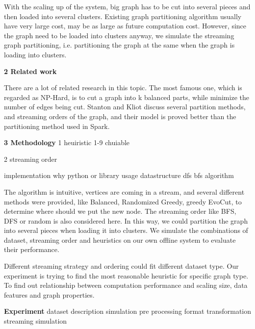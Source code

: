 \documentclass[12pt]{article}
\begin{document}
With the scaling up of the system, big graph has to be cut into several pieces and then loaded into several clusters. Existing graph partitioning algorithm usually have very large cost, may be as large as future computation cost. However, since the graph need to be loaded into clusters anyway, we simulate the streaming graph partitioning, i.e. partitioning the graph at the same when the graph is loading into clusters.

\textbf{2 Related work}

There are a lot of related research in this topic. The most famous one, which is regarded as NP-Hard, is to cut a graph into k balanced parts, while minimize the number of edges being cut. Stanton and Kliot discuss several partition methods, and streaming orders of the graph, and their model is proved better than the partitioning method used in Spark.

\textbf{3 Methodology}
1 heuiristic
	1-9 chuiable

2 streaming order

implementation
	why python or library usage
	datastructure
	dfs bfs algorithm

The algorithm is intuitive, vertices are coming in a stream, and several different methods were provided, like Balanced, Randomized Greedy, greedy EvoCut, to determine where should we put the new node. The streaming order like BFS, DFS or random is also considered here. In this way, we could partition the graph into several pieces when loading it into clusters. We simulate the combinations of dataset, streaming order and heuristics on our own offline system to evaluate their performance.

Different streaming strategy and ordering could fit different dataset type. Our experiment is trying to find the most reasonable heuristic for specific graph type. To find out relationship between computation performance and scaling size, data features and graph properties.

\textbf{Experiment}
dataset description
simulation
	pre processing
	format transformation
	streaming simulation
\end{document}
